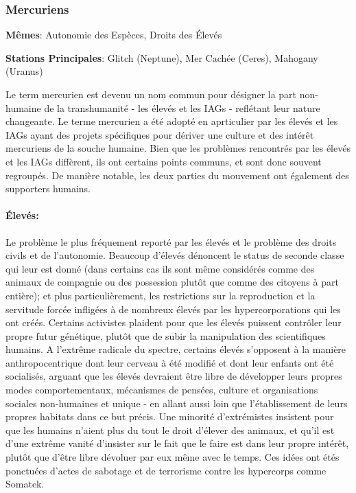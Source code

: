                                           \subsubsection{Mercuriens} \label{sec:mercurials} 

                                          \textbf{Mêmes}: Autonomie des Espèces, Droits des Élevés 

                                          \textbf{Stations Principales}: Glitch (Neptune), Mer Cachée (Ceres), Mahogany (Uranus) 

                                          Le term mercurien est devenu un nom commun pour désigner la part non-humaine de la transhumanité - les élevés et les IAGs - reflétant leur nature changeante. Le terme mercurien a été adopté en aprticulier par les élevés et les IAGs ayant des projets spécifiques pour dériver une culture et des intérêt mercuriens de la souche humaine. Bien que les problèmes rencontrés par les élevés et les IAGs diffèrent, ils ont certains points communs, et sont donc souvent regroupés. De manière notable, les deux parties du mouvement ont également des supporters humains. 

                                          \paragraph{Élevés:} Le problème le plus fréquement reporté par les élevés et le problème des droits civils et de l'autonomie. Beaucoup d'élevés dénoncent le status de seconde classe qui leur est donné (dans certains cas ils sont même considérés comme des animaux de compagnie ou des possession plutôt que comme des citoyens à part entière); et plus particulièrement, les restrictions sur la reproduction et la servitude forcée infligées à de nombreux élevés par les hypercorporations qui les ont créés. Certains activistes plaident pour que les élevés puissent contrôler leur propre futur génétique, plutôt que de subir la manipulation des scientifiques humains. A l'extrême radicale du spectre, certains élevés s'opposent à la manière anthropocentrique dont leur cerveau à été modifié et dont leur enfants ont été socialisés, arguant que les élevés devraient être libre de développer leurs propres modes comportementaux, mécanismes de pensées, culture et organisations sociales non-humaines et unique - en allant aussi loin que l'établissement de leurs propres habitats dans ce but précis. Une minorité d'extrémistes insistent pour que les humains n'aient plus du tout le droit d'élever des animaux, et qu'il est d'une extrême vanité d'insister sur le fait que le faire est dans leur propre intérêt, plutôt que d'être libre dévoluer par eux même avec le temps. Ces idées ont étés ponctuées d'actes de sabotage et de terrorisme contre les hypercorps comme Somatek. 

